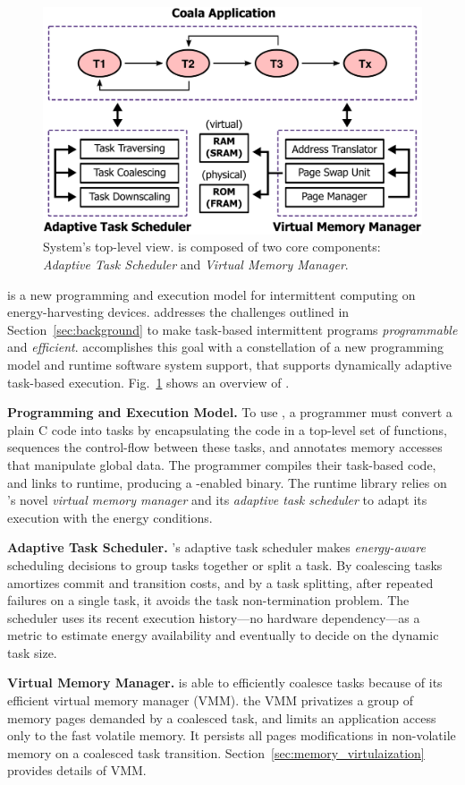 \begin{figure}
	\centering
	\includegraphics[width=\columnwidth]{figures/overview.pdf}
	\caption{System's top-level view. \sys is composed of two core components: \emph{Adaptive Task Scheduler} and \emph{Virtual Memory Manager}.}
	\label{fig:system_overview}
\end{figure}
%
\sys is a new programming and execution model for intermittent computing on energy-harvesting devices. \sys addresses the challenges outlined in Section~\ref{sec:background} to make task-based intermittent programs {\em programmable} and {\em efficient}. \sys accomplishes this goal with a constellation of a new programming model and runtime software system support, that supports dynamically adaptive task-based execution. Fig.~\ref{fig:system_overview} shows an overview of \sys.

\textbf{Programming and Execution Model.}  To use \sys, a programmer must convert a plain C code into tasks by encapsulating the code in a top-level set of functions, sequences the control-flow between these tasks, and annotates memory accesses that manipulate global data.
The programmer compiles their task-based code, and links to \sys runtime,
producing a \sys-enabled binary. The runtime library relies on \sys's novel
{\em virtual memory manager} and its {\em adaptive task scheduler} to adapt its execution with the energy conditions.

\textbf{Adaptive Task Scheduler.} 
\sys's adaptive task scheduler makes \emph{energy-aware} scheduling decisions to group tasks together or split a task. By coalescing tasks \sys amortizes commit and transition costs, and by a task splitting, after repeated failures on a single task, it avoids the task non-termination problem. The scheduler uses its recent execution history---no hardware dependency---as a metric to estimate energy availability and eventually to decide on the dynamic task size. 

\textbf{Virtual Memory Manager.} \sys is able to efficiently coalesce
tasks because of its efficient virtual memory manager (VMM).
the VMM privatizes a group of memory pages demanded by a coalesced task, and limits an application access only to the fast volatile memory. It persists all pages modifications in non-volatile memory on a coalesced task transition. Section~\ref{sec:memory_virtulaization} provides details of VMM.
